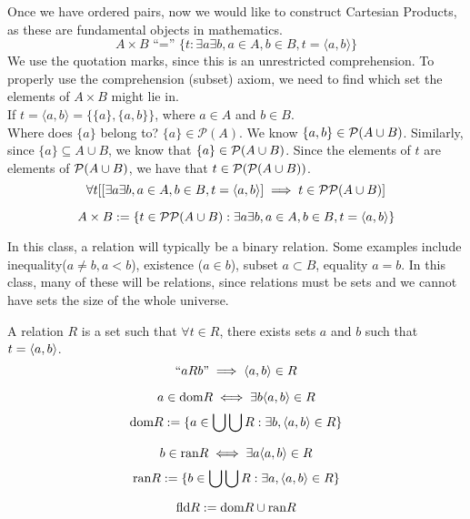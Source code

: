 \begin{rem}
Once we have ordered pairs, now we would like to construct Cartesian Products, as these are fundamental objects in mathematics.
\[A \times B \text{ ``='' } \{t: \exists a \exists b, a \in A, b \in B, t = \langle a, b\rangle\}\]
We use the quotation marks, since this is an unrestricted comprehension. To properly use the comprehension (subset) axiom, we need to find which set the elements of $A \times B$ might lie in.\\
If $t = \langle a, b\rangle = \{\{a\}, \{a, b\}\}$, where $a \in A$ and $b \in B$.\\
Where does $\{a\}$ belong to? $\{a\} \in \mathcal{P}(A)$. We know $\{a, b\} \in \P(A \cup B)$. Similarly, since $\{a\} \subseteq A \cup B$, we know that $\{a\} \in \P(A \cup B)$. Since the elements of $t$ are elements of $\P(A \cup B)$, we have that $t \in \P(\P(A \cup B))$. 
\[\forall t [[\exists a \exists b, a \in A, b \in B, t = \la a, b\ra] \implies t \in \P\P(A \cup B)]\]
\end{rem}
\begin{defn}
\[A \times B := \{t \in \P\P(A \cup B): \exists a \exists b, a \in A, b \in B, t = \la a, b\ra\}\]
\end{defn}
\begin{rem}
In this class, a relation will typically be a binary relation. Some examples include inequality($a \neq b, a < b$), existence ($a \in b$), subset $a \subset B$, equality $a = b$. In this class, many of these will be relations, since relations must be sets and we cannot have sets the size of the whole universe.
\end{rem}
\begin{defn}[Relation] A relation $R$ is a set such that $\forall t \in R$, there exists sets $a$ and $b$ such that $t = \la a, b\ra$.\\
\[\text{``}aRb\text{''} \implies \la a, b\ra \in R\]
\end{defn}
\begin{defn}[Domain]
\[a \in \dom R \iff \exists b \la a, b\ra \in R\]
\[\dom R := \{a \in \bigcup \bigcup R: \exists b, \la a, b\ra \in R\}\]
\end{defn}
\begin{defn}[Range]
\[b \in \ran R \iff \exists a \la a, b\ra \in R\]
\[\ran R := \{b \in \bigcup \bigcup R: \exists a, \la a, b\ra \in R\}\]
\end{defn}
\begin{defn}[Field]
\[\fld R := \dom R \cup \ran R\]
\end{defn}
